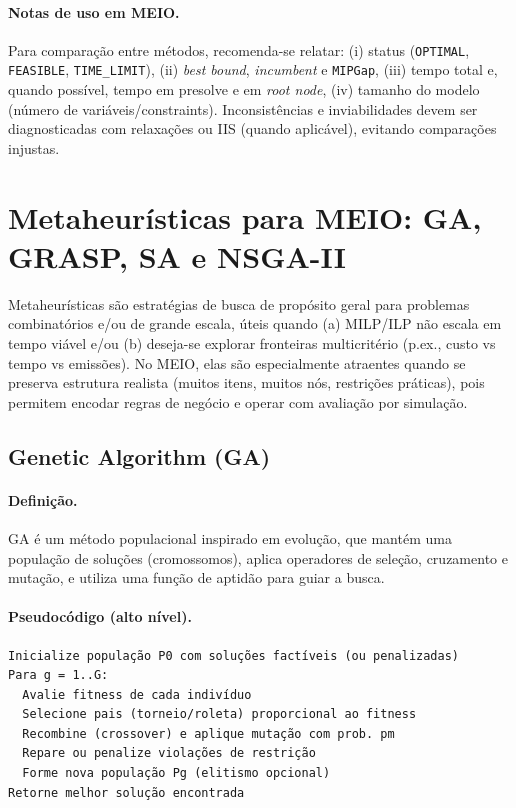 \paragraph{Notas de uso em MEIO.}
Para comparação entre métodos, recomenda-se relatar: (i) status (\texttt{OPTIMAL}, \texttt{FEASIBLE}, \texttt{TIME\_LIMIT}), (ii) \emph{best bound}, \emph{incumbent} e \texttt{MIPGap}, (iii) tempo total e, quando possível, tempo em presolve e em \emph{root node}, (iv) tamanho do modelo (número de variáveis/constraints). Inconsistências e inviabilidades devem ser diagnosticadas com relaxações ou IIS (quando aplicável), evitando comparações injustas. \cite{GurobiParamReference,GurobiParamGuidelines}

\section{Metaheurísticas para MEIO: GA, GRASP, SA e NSGA-II}

Metaheurísticas são estratégias de busca de propósito geral para problemas combinatórios e/ou de grande escala, úteis quando (a) MILP/ILP não escala em tempo viável e/ou (b) deseja-se explorar fronteiras multicritério (p.ex., custo vs tempo vs emissões). \cite{Talbi2009Metaheuristics} No MEIO, elas são especialmente atraentes quando se preserva estrutura realista (muitos itens, muitos nós, restrições práticas), pois permitem encodar regras de negócio e operar com avaliação por simulação.

\subsection{Genetic Algorithm (GA)}

\paragraph{Definição.}
GA é um método populacional inspirado em evolução, que mantém uma população de soluções (cromossomos), aplica operadores de seleção, cruzamento e mutação, e utiliza uma função de aptidão para guiar a busca. \cite{Talbi2009Metaheuristics,Holland1992ANAS}

\paragraph{Pseudocódigo (alto nível).}
\begin{verbatim}
Inicialize população P0 com soluções factíveis (ou penalizadas)
Para g = 1..G:
  Avalie fitness de cada indivíduo
  Selecione pais (torneio/roleta) proporcional ao fitness
  Recombine (crossover) e aplique mutação com prob. pm
  Repare ou penalize violações de restrição
  Forme nova população Pg (elitismo opcional)
Retorne melhor solução encontrada
\end{verbatim}

